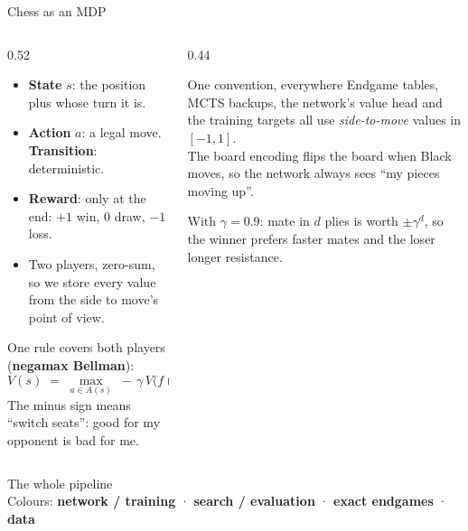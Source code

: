 \documentclass[aspectratio=169, 10pt]{beamer}
\newcommand{\track}[2]{{\color{#1}\textbf{#2}}}
\begin{document}
\begin{frame}{Chess as an MDP}
  \small
  \begin{columns}[T]
    \begin{column}{0.52\textwidth}
      \begin{itemize}
        \item \textbf{State} $s$: the position plus whose turn it is.
        \item \textbf{Action} $a$: a legal move. \textbf{Transition}: deterministic.
        \item \textbf{Reward}: only at the end: $+1$ win, $0$ draw, $-1$ loss.
        \item Two players, zero-sum, so we store every value \alert{from the side to move's
          point of view}.
      \end{itemize}
      \medskip
      One rule covers both players (\textbf{negamax Bellman}):
      \[
        V(s) \;=\; \max_{a \in A(s)} \; -\,\gamma\, V\big(f(s,a)\big)
      \]
      The minus sign means ``switch seats'': good for my opponent is bad for me.
    \end{column}
    \begin{column}{0.44\textwidth}
      \begin{block}{One convention, everywhere}
        \small
        Endgame tables, MCTS backups, the network's value head and the training targets all
        use \emph{side-to-move} values in $[-1,1]$.\\[4pt]
        The board encoding flips the board when Black moves, so the network always sees
        ``my pieces moving up''.
      \end{block}
      \medskip
      {\small With $\gamma = 0.9$: mate in $d$ plies is worth $\pm\gamma^{d}$, so the winner
      prefers faster mates and the loser longer resistance.}
    \end{column}
  \end{columns}
\end{frame}

\begin{frame}{The whole pipeline}
  \centering
  \resizebox{\textwidth}{!}{}\\[2pt]
  {\scriptsize Colours: \track{acNet}{network / training} · \track{acSearch}{search /
  evaluation} · \track{acDP}{exact endgames} · \track{acData}{data}}
\end{frame}
\end{document}
